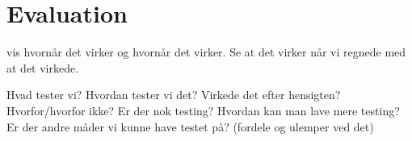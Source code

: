 
\section{Evaluation}

vis hvornår det virker og hvornår det virker. 
Se at det virker når vi regnede med at det virkede.

Hvad tester vi?
Hvordan tester vi det?
Virkede det efter hensigten?
Hvorfor/hvorfor ikke?
Er der nok testing?
Hvordan kan man lave mere testing?
Er der andre måder vi kunne have testet på? (fordele og ulemper ved det)

